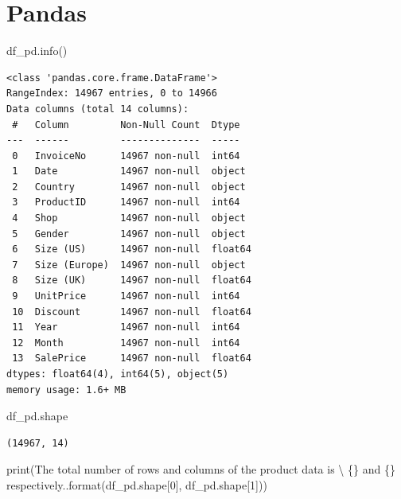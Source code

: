 \documentclass[
  letterpaper,
  DIV=11,
  numbers=noendperiod]{scrreprt}
\newenvironment{Shaded}{\begin{snugshade}}{\end{snugshade}}
\newcommand{\BuiltInTok}[1]{\textcolor[rgb]{0.00,0.23,0.31}{#1}}
\newcommand{\DecValTok}[1]{\textcolor[rgb]{0.68,0.00,0.00}{#1}}
\newcommand{\NormalTok}[1]{\textcolor[rgb]{0.00,0.23,0.31}{#1}}
\newcommand{\OperatorTok}[1]{\textcolor[rgb]{0.37,0.37,0.37}{#1}}
\newcommand{\SpecialCharTok}[1]{\textcolor[rgb]{0.37,0.37,0.37}{#1}}
\newcommand{\StringTok}[1]{\textcolor[rgb]{0.13,0.47,0.30}{#1}}
\begin{document}
\section{Pandas}

\begin{Shaded}
\begin{Highlighting}[]
\NormalTok{df\_pd.info()}
\end{Highlighting}
\end{Shaded}

\begin{verbatim}
<class 'pandas.core.frame.DataFrame'>
RangeIndex: 14967 entries, 0 to 14966
Data columns (total 14 columns):
 #   Column         Non-Null Count  Dtype  
---  ------         --------------  -----  
 0   InvoiceNo      14967 non-null  int64  
 1   Date           14967 non-null  object 
 2   Country        14967 non-null  object 
 3   ProductID      14967 non-null  int64  
 4   Shop           14967 non-null  object 
 5   Gender         14967 non-null  object 
 6   Size (US)      14967 non-null  float64
 7   Size (Europe)  14967 non-null  object 
 8   Size (UK)      14967 non-null  float64
 9   UnitPrice      14967 non-null  int64  
 10  Discount       14967 non-null  float64
 11  Year           14967 non-null  int64  
 12  Month          14967 non-null  int64  
 13  SalePrice      14967 non-null  float64
dtypes: float64(4), int64(5), object(5)
memory usage: 1.6+ MB
\end{verbatim}

\begin{Shaded}
\begin{Highlighting}[]
\NormalTok{df\_pd.shape}
\end{Highlighting}
\end{Shaded}

\begin{verbatim}
(14967, 14)
\end{verbatim}

\begin{Shaded}
\begin{Highlighting}[]
\BuiltInTok{print}\NormalTok{(}\StringTok{\textquotesingle{}The total number of rows and columns of the product data is }\OperatorTok{\textbackslash{}}
\StringTok{ }\SpecialCharTok{\{\}}\StringTok{ and }\SpecialCharTok{\{\}}\StringTok{ respectively.\textquotesingle{}}\NormalTok{.}\BuiltInTok{format}\NormalTok{(df\_pd.shape[}\DecValTok{0}\NormalTok{], df\_pd.shape[}\DecValTok{1}\NormalTok{]))}
\end{Highlighting}
\end{Shaded}
\end{document}
